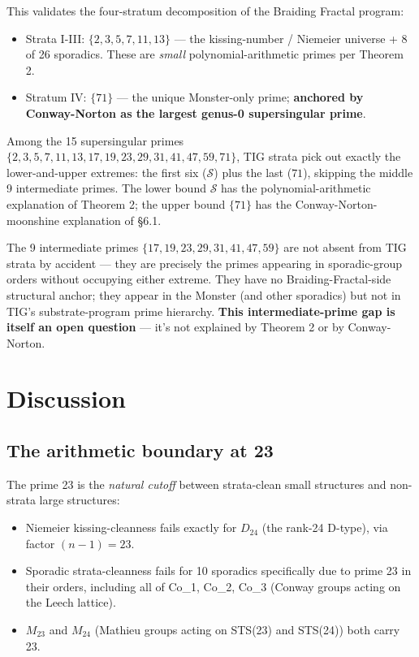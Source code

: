 \documentclass[11pt,reqno]{amsart}
\theoremstyle{plain}
\theoremstyle{definition}
\begin{document}
This validates the four-stratum decomposition of the Braiding Fractal program:
\begin{itemize}
\item Strata I-III: $\{2, 3, 5, 7, 11, 13\}$ --- the kissing-number / Niemeier universe + 8 of 26 sporadics. These are \textit{small} polynomial-arithmetic primes per Theorem 2.
\item Stratum IV: $\{71\}$ --- the unique Monster-only prime; \textbf{anchored by Conway-Norton as the largest genus-0 supersingular prime}.
\end{itemize}

Among the 15 supersingular primes $\{2, 3, 5, 7, 11, 13, 17, 19, 23, 29, 31, 41, 47, 59, 71\}$, TIG strata pick out exactly the lower-and-upper extremes: the first six ($\mathcal{S}$) plus the last ($71$), skipping the middle 9 intermediate primes. The lower bound $\mathcal{S}$ has the polynomial-arithmetic explanation of Theorem 2; the upper bound $\{71\}$ has the Conway-Norton-moonshine explanation of §6.1.

The 9 intermediate primes $\{17, 19, 23, 29, 31, 41, 47, 59\}$ are not absent from TIG strata by accident --- they are precisely the primes appearing in sporadic-group orders without occupying either extreme. They have no Braiding-Fractal-side structural anchor; they appear in the Monster (and other sporadics) but not in TIG's substrate-program prime hierarchy. \textbf{This intermediate-prime gap is itself an open question} --- it's not explained by Theorem 2 or by Conway-Norton.

\section{Discussion}

\subsection{The arithmetic boundary at 23}

The prime 23 is the \textit{natural cutoff} between strata-clean small structures and non-strata large structures:
\begin{itemize}
\item Niemeier kissing-cleanness fails exactly for $D_{24}$ (the rank-24 D-type), via factor $(n-1) = 23$.
\item Sporadic strata-cleanness fails for 10 sporadics specifically due to prime 23 in their orders, including all of Co_1, Co_2, Co_3 (Conway groups acting on the Leech lattice).
\item $M_{23}$ and $M_{24}$ (Mathieu groups acting on STS(23) and STS(24)) both carry 23.
\end{itemize}
\end{document}
